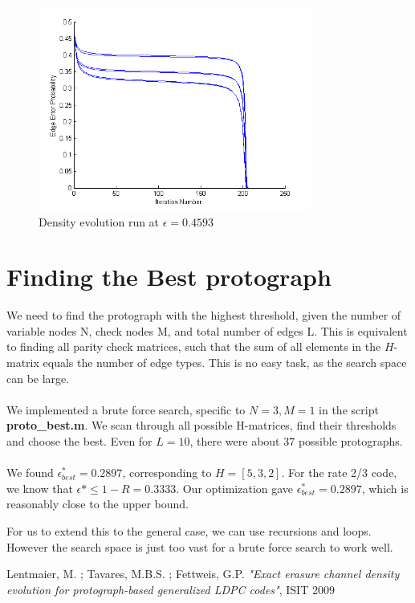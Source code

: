 \documentclass[paper=a4, fontsize=12pt]{scrartcl} %
\numberwithin{equation}{section} %
\numberwithin{figure}{section} %
\numberwithin{table}{section} %
\begin{document}
\begin{figure}[h]
\centering
\includegraphics[width=0.8\textwidth]{images/proto-de}
\caption{Density evolution run at $\epsilon = 0.4593$ }
\label{de}
\end{figure}


\pagebreak
\section{Finding the Best protograph}
We need to find the protograph with the highest threshold, given the number of variable nodes N, check nodes M, and total number of edges L. This is equivalent to finding all parity check matrices, such that the sum of all elements in the $H$-matrix equals the number of edge types. This is no easy task, as the search space can be large.
\\ \\
We implemented a brute force search, specific to $N=3,M=1$ in the script \textbf{proto\_best.m}. We scan through all possible H-matrices, find their thresholds and choose the best. Even for $L=10$, there were about $37$ possible protographs. 
\\ \\
We found $\epsilon^*_{best} = 0.2897$, corresponding to $H=\left[5,3,2\right]$. For the rate 2/3 code, we know that $\epsilon* \leq 1 - R = 0.3333$. Our optimization gave $\epsilon^*_{best} = 0.2897$, which is reasonably close to the upper bound. 

For us to extend this to the general case, we can use recursions and loops. However the search space is just too vast for a brute force search to work well. 

\begin{thebibliography}{155}
Lentmaier, M. ; Tavares, M.B.S. ; Fettweis, G.P. \textit{"Exact erasure channel density evolution for protograph-based generalized LDPC codes"}, ISIT 2009

\end{thebibliography}
\end{document}
